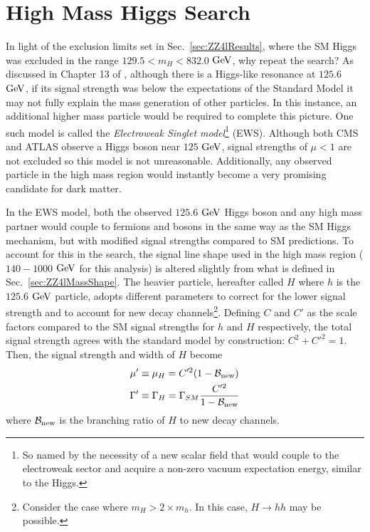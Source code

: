 \section{High Mass Higgs Search}
\label{sec:HighMass}

In light of the exclusion limits set in Sec.~\ref{sec:ZZ4lResults}, where the SM Higgs was excluded in the range $129.5<m_H<832.0$ $\rm{GeV}$, why repeat the search? As discussed in Chapter 13 of \cite{HXSWG_Properties}, although there is a Higgs-like resonance at $125.6$ $\rm{GeV}$, if its signal strength was below the expectations of the Standard Model it may not fully explain the mass generation of other particles. In this instance, an additional higher mass particle would be required to complete this picture. One such model is called the \textit{Electroweak Singlet model}\footnote{So named by the necessity of a new scalar field that would couple to the electroweak sector and acquire a non-zero vacuum expectation energy, similar to the Higgs.} (EWS). Although both CMS and ATLAS observe a Higgs boson near $125$ $\rm{GeV}$, signal strengths of $\mu<1$ are not excluded so this model is not unreasonable. Additionally, any observed particle in the high mass region would instantly become a very promising candidate for dark matter.

In the EWS model, both the observed $125.6$ $\rm{GeV}$ Higgs boson and any high mass partner would couple to fermions and bosons in the same way as the SM Higgs mechanism, but with modified signal strengths compared to SM predictions. To account for this in the search, the signal line shape used in the high mass region ($140-1000$ $\rm{GeV}$ for this analysis) is altered slightly from what is defined in Sec.~\ref{sec:ZZ4lMassShape}. The heavier particle, hereafter called $H$ where $h$ is the $125.6$ $\rm{GeV}$ particle, adopts different parameters to correct for the lower signal strength and to account for new decay channels\footnote{Consider the case where $m_{H} > 2\times m_{h}$. In this case, $H\rightarrow hh$ may be possible.}. Defining $C$ and $C'$ as the scale factors compared to the SM signal strengths for $h$ and $H$ respectively, the total signal strength agrees with the standard model by construction: $C^2 + C'^2 = 1$. Then, the signal strength and width of $H$ become
\begin{align}
\mu' &\equiv \mu_{H} = C'^2 (1-\mathcal{B}_{\rm{new}}) \\
\Gamma' &\equiv \Gamma_{H} = \Gamma_{SM}\frac{C'^2}{1-\mathcal{B}_{\rm{new}}}
\end{align} 
where $\mathcal{B}_{\rm{new}}$ is the branching ratio of $H$ to new decay channels.

